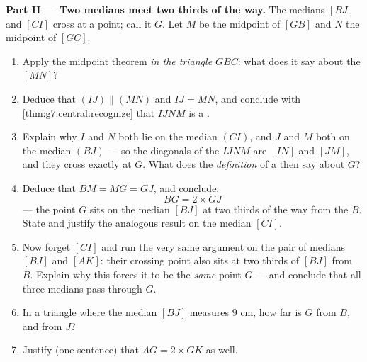 \begin{problem}
\medskip
\noindent\textbf{Part II --- Two medians meet two thirds of the
way.}
The medians $[BJ]$ and $[CI]$ cross at a point; call it $G$. Let
$M$ be the midpoint of $[GB]$ and $N$ the midpoint of $[GC]$.
\begin{enumerate}[resume]
  \item Apply the midpoint theorem \emph{in the triangle $GBC$}:
        what does it say about the  $[MN]$?
  \item Deduce that $(IJ) \parallel (MN)$ and $IJ = MN$, and
        conclude with \cref{thm:g7:central:recognize} that $IJNM$
        is a .
  \item Explain why $I$ and $N$ both lie on the median $(CI)$,
        and $J$ and $M$ both on the median $(BJ)$ --- so the
        diagonals of the  $IJNM$ are $[IN]$ and
        $[JM]$, and they cross exactly at $G$. What does the
        \emph{definition} of a  then say about $G$?
  \item Deduce that $BM = MG = GJ$, and conclude:
        \[
        BG = 2 \times GJ
        \]
        --- the point $G$ sits on the median $[BJ]$ at two thirds
        of the way from the  $B$. State and justify the
        analogous result on the median $[CI]$.
  \item Now forget $[CI]$ and run the very same argument on the
        pair of medians $[BJ]$ and $[AK]$: their crossing point
        also sits at two thirds of $[BJ]$ from $B$. Explain why
        this forces it to be the \emph{same} point $G$ --- and
        conclude that all three medians pass through $G$.
  \item In a triangle where the median $[BJ]$ measures $9$ cm,
        how far is $G$ from $B$, and from $J$?
  \item Justify (one sentence) that $AG = 2 \times GK$ as well.
\end{enumerate}


\end{problem}
